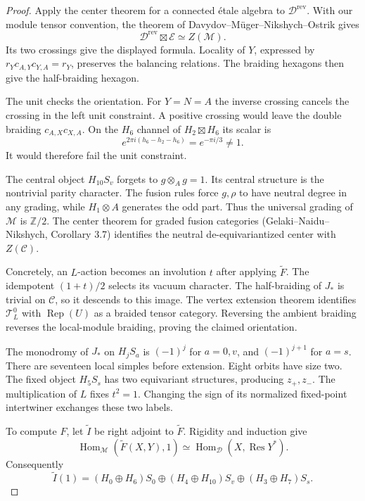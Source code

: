 \begin{proof}
Apply the center theorem for a connected étale algebra to
$\mathcal D^{\mathrm{rev}}$.
With our module tensor convention, the theorem of
Davydov--Müger--Nikshych--Ostrik gives
\[
 \mathcal D^{\mathrm{rev}}\boxtimes\mathcal E
 \simeq Z(\mathcal M).
\]
Its two crossings give the displayed formula.
Locality of $Y$, expressed by
$r_Yc_{A,Y}c_{Y,A}=r_Y$, preserves the balancing relations.
The braiding hexagons then give the half-braiding hexagon.

The unit checks the orientation. For $Y=N=A$ the inverse
crossing cancels the crossing in the left unit constraint.
A positive crossing would leave the double braiding
$c_{A,X}c_{X,A}$. On the $H_6$ channel of
$H_2\boxtimes H_6$ its scalar is
\[
 e^{2\pi i(h_6-h_2-h_6)}=e^{-\pi i/3}\ne1.
\]
It would therefore fail the unit constraint.

The central object $H_{10}S_v$ forgets to $g\otimes_A g=1$.
Its central structure is the nontrivial parity character.
The fusion rules force $g,\rho$ to have neutral degree in
any grading, while $H_1\otimes A$ generates the odd part.
Thus the universal grading of $\mathcal M$ is $\mathbb Z/2$.
The center theorem for graded fusion categories
(Gelaki--Naidu--Nikshych, Corollary 3.7)
identifies the neutral de-equivariantized center with
$Z(\mathcal C)$.

Concretely, an $L$-action becomes an involution $t$ after
applying $\widetilde F$. The idempotent $(1+t)/2$ selects
its vacuum character. The half-braiding of $J_*$ is trivial
on $\mathcal C$, so it descends to this image.
The vertex extension theorem identifies
$\mathcal T_L^0$ with $\operatorname{Rep}(U)$ as a braided
tensor category. Reversing the ambient braiding reverses
the local-module braiding, proving the claimed orientation.

The monodromy of $J_*$ on $H_jS_a$ is $(-1)^j$ for
$a=0,v$, and $(-1)^{j+1}$ for $a=s$.
There are seventeen local simples before extension.
Eight orbits have size two. The fixed object $H_5S_s$
has two equivariant structures, producing $z_+,z_-$.
The multiplication of $L$ fixes $t^2=1$. Changing the
sign of its normalized fixed-point intertwiner exchanges
these two labels.

To compute $F$, let $\widetilde I$ be right adjoint to
$\widetilde F$. Rigidity and induction give
\[
 \operatorname{Hom}_{\mathcal M}(\widetilde F(X,Y),1)
 \simeq
 \operatorname{Hom}_{\mathcal D}(X,\operatorname{Res}Y^*).
\]
Consequently
\[
 \widetilde I(1)=
 (H_0\oplus H_6)S_0\oplus
 (H_4\oplus H_{10})S_v\oplus
 (H_3\oplus H_7)S_s.
\]


\end{proof}
